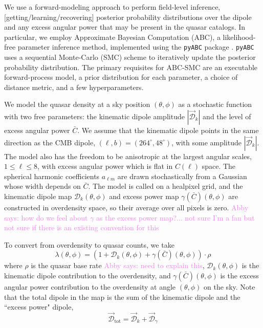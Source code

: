 \documentclass[modern]{aastex631}
\newcommand{\abby}[1]{\textcolor{violet}{Abby says: #1}}
\newcommand{\dipamp}{|\vec{\mathcal{D}}_k|}
\begin{document}
We use a forward-modeling approach to perform field-level inference, [getting/learning/recovering] posterior probability distributions over the dipole and any excess angular power that may be present in the quasar catalogs.
In particular, we employ Approximate Bayesian Computation (ABC), a likelihood-free parameter inference method, implemented using the \texttt{pyABC} package \citep{schalte_pyabc_2022}.
\texttt{pyABC} uses a sequential Monte-Carlo (SMC) scheme to iteratively update the posterior probability distribution.
The primary requisites for ABC-SMC are an executable forward-process model, a prior distribution for each parameter, a choice of distance metric, and a few hyperparameters.

We model the quasar density at a sky position $(\theta,\phi)$ as a stochastic function with two free parameters: the kinematic dipole amplitude $\dipamp$ and the level of excess angular power $\bar C$.
We assume that the kinematic dipole points in the same direction as the CMB dipole, $(\ell,b)=(264^\circ,48^\circ)$, with some amplitude $|\vec{\mathcal{D}}_k|$.
The model also has the freedom to be anisotropic at the largest angular scales, $1\le\ell\le 8$, with excess angular power which is flat in $C(\ell)$ space.
The spherical harmonic coefficients $a_{\ell m}$ are drawn stochastically from a Gaussian whose width depends on $\bar C$.
The model is called on a healpixel grid, and the kinematic dipole map $\mathcal{D}_k(\theta,\phi)$ and excess power map $\gamma(\bar C)(\theta,\phi)$ are constructed in overdensity space, so their average over all pixels is zero.
\abby{how do we feel about $\gamma$ as the excess power map?... not sure I'm a fan but not sure if there is an existing convention for this}

To convert from overdensity to quasar counts, we take
\begin{equation}
    \lambda(\theta,\phi) = (1 + \mathcal{D}_k(\theta,\phi) + \gamma(\bar C)(\theta, \phi)) \cdot \rho
\end{equation}
where $\rho$ is the quasar base rate \abby{need to explain this}, $\mathcal{D}_k(\theta,\phi)$ is the kinematic dipole contribution to the overdensity, and $\gamma(\bar C)(\theta,\phi)$ is the excess angular power contribution to the overdensity at angle $(\theta,\phi)$ on the sky.
Note that the total dipole in the map is the sum of the kinematic dipole and the ``excess power" dipole,
\begin{equation}
    \vec{\mathcal{D}}_\mathrm{tot}=\vec{\mathcal{D}}_k + \vec{\mathcal{D}}_\gamma 
\end{equation}
\end{document}
